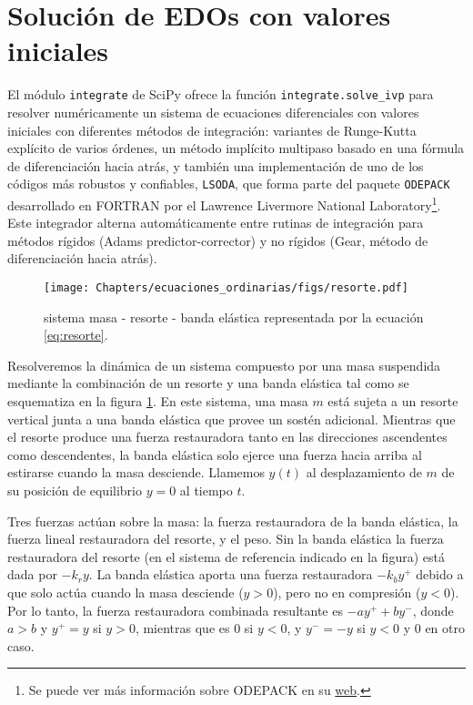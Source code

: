  \section{Solución de EDOs con valores iniciales}
 El módulo \verb|integrate| de SciPy ofrece la función \verb|integrate.solve_ivp| para resolver numéricamente un sistema de ecuaciones diferenciales con valores iniciales con diferentes métodos de integración: variantes de Runge-Kutta explícito de varios órdenes, un método implícito multipaso basado en una fórmula de diferenciación hacia atrás, y también una implementación de uno de los códigos más robustos y confiables, \verb|LSODA|, que forma parte del paquete  \verb|ODEPACK| desarrollado en FORTRAN por el Lawrence Livermore National Laboratory\footnote{Se puede ver más información sobre ODEPACK en su \href{https://computing.llnl.gov/casc/odepack/}{web}.}. Este integrador alterna automáticamente entre rutinas de integración para métodos rígidos (Adams predictor-corrector) y no rígidos (Gear, método de diferenciación hacia atrás). 
 
 \begin{figure}[t]
 \centering
 \texttt{[image: Chapters/ecuaciones\_ordinarias/figs/resorte.pdf]}
 \caption{sistema masa - resorte - banda elástica representada por la ecuación \ref{eq:resorte}.}
 \label{fig:resorte}
\end{figure}

 
 Resolveremos la dinámica de un sistema compuesto por una masa suspendida mediante la combinación de un resorte y una banda elástica \cite{humphreys2000} tal como se esquematiza en la figura \ref{fig:resorte}. En este sistema, una masa $m$ está sujeta a un resorte vertical junta a una banda elástica que provee un sostén adicional. Mientras que el resorte produce una fuerza restauradora tanto en las direcciones ascendentes como descendentes, la banda elástica solo ejerce una fuerza hacia arriba al estirarse cuando la masa desciende. Llamemos $y(t)$ al desplazamiento de $m$ de su posición de equilibrio $y = 0$ al tiempo $t$.
 
 Tres fuerzas actúan sobre la masa: la fuerza restauradora de la banda elástica, la fuerza lineal restauradora del resorte, y el peso. Sin la banda elástica la fuerza restauradora del resorte (en el sistema de referencia indicado en la figura) está dada por $-k_r y$. La banda elástica aporta una fuerza restauradora $-k_b y^+$ debido a que solo actúa cuando la masa desciende ($y>0$), pero no en compresión ($y<0$). Por lo tanto, la fuerza restauradora combinada resultante es $-a y^+ + b y^-$, donde $a > b$ y $y^+ = y$ si $y > 0$, mientras que es $0$ si $y < 0$, y $y^- = -y$ si $y < 0$ y $0$ en otro caso. 
 
